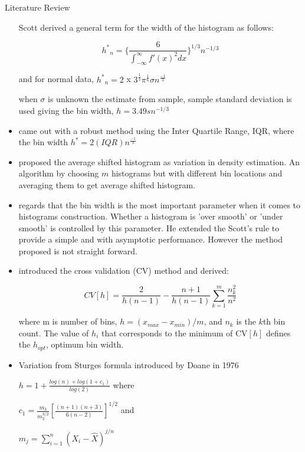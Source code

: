 \documentclass{beamer}
\begin{document}
\begin{frame}[allowframebreaks]{Literature Review}
\begin{itemize}
	Scott derived a general term for the width of the histogram as follows:
	
	\begin{equation}
	{h^*}_n =         \Bigg\{     \frac{6}{\int_{{-}\infty}^{\infty} {f'}(x)^{2} dx}  \Bigg\}^{1/3}n^{-1/3}
	\end{equation}
	
	and for normal data, ${h^*}_n = 2 $ x $ 3^{\frac{1}{3}}\pi^{\frac{1}{6}}\sigma n^{\frac{-1}{3}}$
	
	when $\sigma$ is unknown the estimate from sample, sample standard deviation is used giving the bin width,  $h =  3.49s n^{ - 1/3}$
	
	\item \cite{freedman1981histogram} came out with a robust method using the Inter Quartile Range, IQR, where the bin width  ${h^*} =  2(IQR) n^{\frac{-1}{3}}$
	
	\item \cite{scott1985} proposed the average shifted histogram as variation in density estimation. An algorithm by choosing $m$ histograms but with different bin locations and averaging them to get average shifted histogram.
	
	\item \cite{wand1997data} regards that the bin width is the most important parameter when it comes to histograms construction. Whether a histogram is 'over smooth' or 'under smooth' is controlled by this parameter. He extended the Scott's rule to provide a simple and with asymptotic performance. However the method proposed is not straight  forward.
	
	\item \cite{bura2009nonparametric} introduced the cross validation (CV) method and derived:
	
	\begin{equation}
	CV\left[h\right] = \frac{2}{h(n-1)} - \frac{n+1}{h(n-1)} \sum_{k=1}^{m}\frac{n_{k}^{2}}{n^2}
	\end{equation}
	
	where m is number of bins, $h=(x_{max} - x_{min})/m$, and $n_k$ is the $k$th bin count. The value of $h_i$ that corresponds to the minimum of CV$\left[h\right]$ defines the $h_{opt}$, optimum bin width.
	
	\item Variation from Sturges formula introduced by Doane in 1976  \cite{wand1997data}
	
	{\center $h = 1 + \frac{log(n) + log(1 + c_1)}{log(2)} $ where \\}
	
	
	{\center $c_1 = \frac{m_3}{m_2^{3/2}} \left[ \frac{(n+1)(n+3)}{6(n-2)}\right]^{1/2}$ and \\}
	
	{\center $ m_j = \sum_{i=1}^{n}(X_i - \hat X)^{j/n}  $\\}
	
\end{itemize}
\end{frame}
\end{document}

